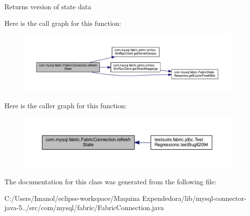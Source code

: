 \begin{DoxyReturn}{Returns}
version of state data 
\end{DoxyReturn}
Here is the call graph for this function\+:\nopagebreak
\begin{figure}[H]
\begin{center}
\leavevmode
\includegraphics[width=350pt]{classcom_1_1mysql_1_1fabric_1_1_fabric_connection_aa008c3c21505a6a3cd81dbe20c8ca9f0_cgraph}
\end{center}
\end{figure}
Here is the caller graph for this function\+:\nopagebreak
\begin{figure}[H]
\begin{center}
\leavevmode
\includegraphics[width=350pt]{classcom_1_1mysql_1_1fabric_1_1_fabric_connection_aa008c3c21505a6a3cd81dbe20c8ca9f0_icgraph}
\end{center}
\end{figure}


The documentation for this class was generated from the following file\+:\begin{DoxyCompactItemize}
\item 
C\+:/\+Users/\+Imanol/eclipse-\/workspace/\+Maquina Expendedora/lib/mysql-\/connector-\/java-\/5../src/com/mysql/fabric/Fabric\+Connection.\+java\end{DoxyCompactItemize}
